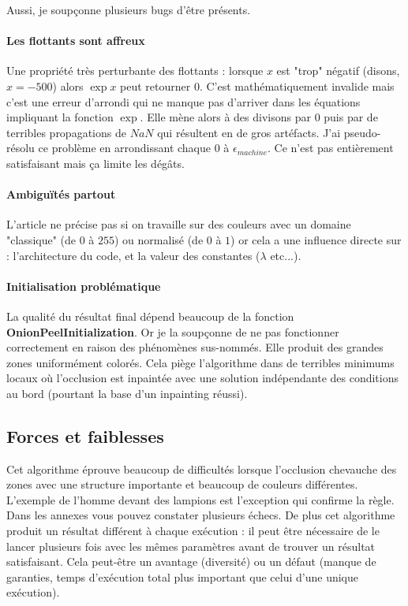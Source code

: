 \documentclass[a4paper, 10pt]{article}
\begin{document}
Aussi, je soupçonne plusieurs bugs d'être présents.  

\paragraph{Les flottants sont affreux}

Une propriété très perturbante des flottants : lorsque $x$ est "trop" négatif (disons, $x=-500$) alors $\exp{x}$ peut retourner $0$. C'est mathématiquement invalide mais c'est une erreur d'arrondi qui ne manque pas d'arriver dans les équations impliquant la fonction $\exp$. Elle mène alors à des divisons par $0$ puis par de terribles propagations de $NaN$ qui résultent en de gros artéfacts. J'ai pseudo-résolu ce problème en arrondissant chaque $0$ à $\epsilon_{machine}$. Ce n'est pas entièrement satisfaisant mais ça limite les dégâts.  
  
\paragraph{Ambiguïtés partout}

L'article ne précise pas si on travaille sur des couleurs avec un domaine "classique" (de $0$ à $255$) ou normalisé (de $0$ à $1$) or cela a une influence directe sur : l'architecture du code, et la valeur des constantes ($\lambda$ etc...).  
  
\paragraph{Initialisation problématique}

La qualité du résultat final dépend beaucoup de la fonction \textbf{OnionPeelInitialization}. Or je la soupçonne de ne pas fonctionner correctement en raison des phénomènes sus-nommés. Elle produit des grandes zones uniformément colorés. Cela piège l'algorithme dans de terribles minimums locaux où l'occlusion est inpaintée avec une solution indépendante des conditions au bord (pourtant la base d'un inpainting réussi).  
  
\subsection{Forces et faiblesses}

Cet algorithme éprouve beaucoup de difficultés lorsque l'occlusion chevauche des zones avec une structure importante et beaucoup de couleurs différentes. L'exemple de l'homme devant des lampions est l'exception qui confirme la règle. Dans les annexes vous pouvez constater plusieurs échecs. De plus cet algorithme produit un résultat différent à chaque exécution : il peut être nécessaire de le lancer plusieurs fois avec les mêmes paramètres avant de trouver un résultat satisfaisant. Cela peut-être un avantage (diversité) ou un défaut (manque de garanties, temps d'exécution total plus important que celui d'une unique exécution).  
  
\end{document}
